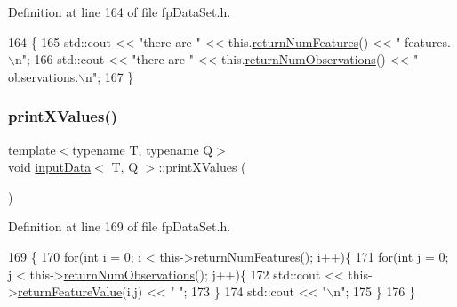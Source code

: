 Definition at line 164 of file fp\+Data\+Set.\+h.


\begin{DoxyCode}
164                              \{
165             std::cout << \textcolor{stringliteral}{"there are "} << this.\hyperlink{classinputData_a8fbb9ac952f73f65295eeb9bf8c3b01a}{returnNumFeatures}() << \textcolor{stringliteral}{" features.\(\backslash\)n"};
166             std::cout << \textcolor{stringliteral}{"there are "} << this.\hyperlink{classinputData_af2ac0a8c7e0bfcdf1de1ea521eadc7af}{returnNumObservations}() << \textcolor{stringliteral}{"
       observations.\(\backslash\)n"};
167         \}
\end{DoxyCode}
\mbox{\label{classinputData_a23adc6270b0904e92b6e87683c12b902}} 
\subsubsection{\texorpdfstring{print\+X\+Values()}{printXValues()}}
{\footnotesize\ttfamily template$<$typename T, typename Q$>$ \\
void \hyperlink{classinputData}{input\+Data}$<$ T, Q $>$\+::print\+X\+Values (\begin{DoxyParamCaption}{ }\end{DoxyParamCaption})\hspace{0.3cm}{\ttfamily [inline]}}



Definition at line 169 of file fp\+Data\+Set.\+h.


\begin{DoxyCode}
169                            \{
170             \textcolor{keywordflow}{for}(\textcolor{keywordtype}{int} i = 0; i < this->\hyperlink{classinputData_a8fbb9ac952f73f65295eeb9bf8c3b01a}{returnNumFeatures}(); i++)\{
171                 \textcolor{keywordflow}{for}(\textcolor{keywordtype}{int} j = 0; j < this->\hyperlink{classinputData_af2ac0a8c7e0bfcdf1de1ea521eadc7af}{returnNumObservations}(); j++)\{
172                     std::cout << this->\hyperlink{classinputData_a8914408ce5de02c3786dc7ff61f6cfab}{returnFeatureValue}(i,j) << \textcolor{stringliteral}{" "};
173                 \}
174                 std::cout << \textcolor{stringliteral}{"\(\backslash\)n"};
175             \}
176         \}
\end{DoxyCode}
\mbox{\label{classinputData_aa5624d9fe35194b617fb21051a49a2c4}} 
